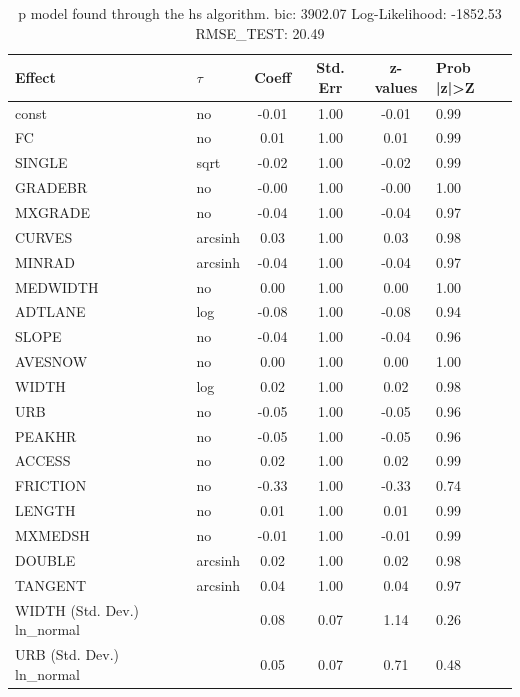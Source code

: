 \begin{table}
	\caption{p model found through the hs algorithm. bic: 3902.07 Log-Likelihood: -1852.53 RMSE_TEST: 20.49}
	\begin{center}
		\begin{tabular}{|l|l|c|c|c|l|}
			\hline
			Effect & $\tau$ & Coeff & Std. Err & z-values & Prob |z|>Z \\
			\hline
			const & no & -0.01 & 1.00 & -0.01 & 0.99 \\
			\hline
			FC & no & 0.01 & 1.00 & 0.01 & 0.99 \\
			\hline
			SINGLE & sqrt & -0.02 & 1.00 & -0.02 & 0.99 \\
			\hline
			GRADEBR & no & -0.00 & 1.00 & -0.00 & 1.00 \\
			\hline
			MXGRADE & no & -0.04 & 1.00 & -0.04 & 0.97 \\
			\hline
			CURVES & arcsinh & 0.03 & 1.00 & 0.03 & 0.98 \\
			\hline
			MINRAD & arcsinh & -0.04 & 1.00 & -0.04 & 0.97 \\
			\hline
			MEDWIDTH & no & 0.00 & 1.00 & 0.00 & 1.00 \\
			\hline
			ADTLANE & log & -0.08 & 1.00 & -0.08 & 0.94 \\
			\hline
			SLOPE & no & -0.04 & 1.00 & -0.04 & 0.96 \\
			\hline
			AVESNOW & no & 0.00 & 1.00 & 0.00 & 1.00 \\
			\hline
			WIDTH & log & 0.02 & 1.00 & 0.02 & 0.98 \\
			\hline
			URB & no & -0.05 & 1.00 & -0.05 & 0.96 \\
			\hline
			PEAKHR & no & -0.05 & 1.00 & -0.05 & 0.96 \\
			\hline
			ACCESS & no & 0.02 & 1.00 & 0.02 & 0.99 \\
			\hline
			FRICTION & no & -0.33 & 1.00 & -0.33 & 0.74 \\
			\hline
			LENGTH & no & 0.01 & 1.00 & 0.01 & 0.99 \\
			\hline
			MXMEDSH & no & -0.01 & 1.00 & -0.01 & 0.99 \\
			\hline
			DOUBLE & arcsinh & 0.02 & 1.00 & 0.02 & 0.98 \\
			\hline
			TANGENT & arcsinh & 0.04 & 1.00 & 0.04 & 0.97 \\
			\hline
			WIDTH (Std. Dev.) ln_normal &  & 0.08 & 0.07 & 1.14 & 0.26 \\
			\hline
			URB (Std. Dev.) ln_normal &  & 0.05 & 0.07 & 0.71 & 0.48 \\
			\hline

\end{tabular}
\end{center}
\end{table}
